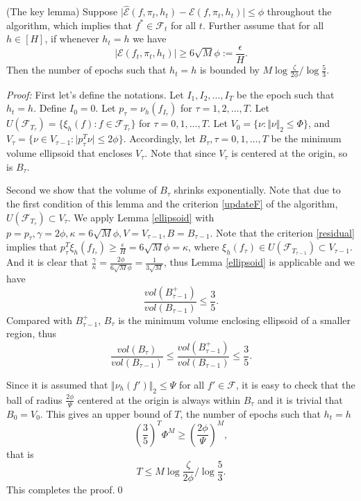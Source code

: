 \documentclass[11pt]{article}
\begin{document}
\begin{lemma}\label{key}
(The key lemma) Suppose $\vert \hat{\mathcal E}(f,\pi_t,h_t)-\mathcal E(f,\pi_t,h_t) \vert\leq \phi$ throughout the algorithm, which implies that $f^*\in \mathcal F_t$ for all $t$. Further assume that for all $h\in[H]$, if whenever $h_t=h$ we have
\begin{equation*}
\vert\mathcal E(f_t,\pi_t,h_t)\vert\geq 6\sqrt{M}\phi:=\frac{\epsilon}{H}.
\end{equation*}
Then the number of epochs such that $h_t=h$ is bounded by $M\log \frac{\zeta}{2\phi}/\log \frac{5}{3}$.
\end{lemma}
\textit{Proof: }First let's define the notations. Let $I_1,I_2,\ldots,I_T$ be the epoch such that $h_t=h$. Define $I_0=0$. Let $p_{\tau}=\nu_h(f_{I_{\tau}})$ for $\tau=1,2,\ldots,T$. Let $U(\mathcal F_{T_{\tau}})=\{\xi_h(f):f\in\mathcal F_{T_{\tau}}\}$ for $\tau=0,1,\ldots,T$. Let $V_0=\{\nu:\Vert\nu\Vert_2\leq \Phi\}$, and $V_{\tau}=\{\nu\in V_{\tau-1}:\vert p_{\tau}^T\nu\vert\leq 2\phi\}$. Accordingly, let $B_{\tau},\tau=0,1,\ldots,T$ be the minimum volume ellipsoid that encloses $V_{\tau}$. Note that since $V_{\tau}$ is centered at the origin, so is $B_{\tau}$.

Second we show that the volume of $B_{\tau}$ shrinks exponentially. Note that due to the first condition of this lemma and the criterion \ref{updateF} of the algorithm, $U(\mathcal F_{T_{\tau}})\subset V_{\tau}$. We apply Lemma \ref{ellipsoid} with $p=p_{\tau},\gamma=2\phi,\kappa=6\sqrt{M}\phi,V=V_{\tau-1},B=B_{\tau-1}$. Note that the criterion \ref{residual} implies that $p_{\tau}^T\xi_h(f_{I_{\tau}})\geq \frac{\epsilon}{H}=6\sqrt{M}\phi=\kappa$, where $\xi_h(f_{\tau})\in U(\mathcal F_{T_{\tau-1}})\subset V_{\tau-1}$. And it is clear that $\frac{\gamma}{\kappa}=\frac{2\phi}{6\sqrt{M}\phi}=\frac{1}{3\sqrt{M}}$, thus Lemma \ref{ellipsoid} is applicable and we have
\begin{equation*}
\frac{vol(B_{\tau-1}^+)}{vol(B_{\tau-1})}\leq \frac{3}{5}.
\end{equation*}
Compared with $B_{\tau-1}^+$, $B_{\tau}$ is the minimum volume enclosing ellipsoid of a smaller region, thus
\begin{equation*}
\frac{vol(B_{\tau})}{vol(B_{\tau-1})}\leq\frac{vol(B_{\tau-1}^+)}{vol(B_{\tau-1})}\leq \frac{3}{5}.
\end{equation*}

Since it is assumed that $\Vert \nu_h(f')\Vert_2\leq \Psi$ for all $f'\in \mathcal F$, it is easy to check that the ball of radius $\frac{2\phi}{\Psi}$ centered at the origin is always within $B_{\tau}$ and it is trivial that $B_{0}=V_0$. This gives an upper bound of $T$, the number of epochs such that $h_t=h$
\begin{equation*}
\left(\frac{3}{5}\right)^T\Phi^M\geq\left(\frac{2\phi}{\Psi}\right)^M,
\end{equation*}
that is
\begin{equation*}
T\leq M\log \frac{\zeta}{2\phi}/\log\frac{5}{3}.
\end{equation*}
This completes the proof.\qed
\end{document}
